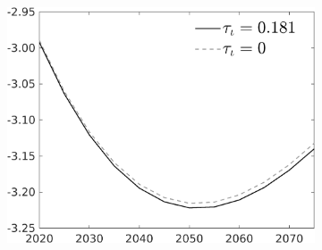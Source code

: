 \begin{figure}[h!!]
\begin{subfigure}{0.9\textwidth}
\begin{minipage}[]{0.32\textwidth}
	\end{minipage}
	\begin{minipage}[]{0.32\textwidth}
		\includegraphics[width=1\textwidth]{../../codding_model/own_basedOnFried/optimalPol_010922_revision/figures/all_13Sept22/PerdifNoTauf_Equlab_regime0_CompTaul_EY_spillover0_nsk0_xgr0_knspil1_sep0_LFlimit0_emsbase0_countec0_GovRev0_etaa0.79_lgd1.png}
	\end{minipage}
\end{subfigure}		
\end{figure} 

\clearpage
